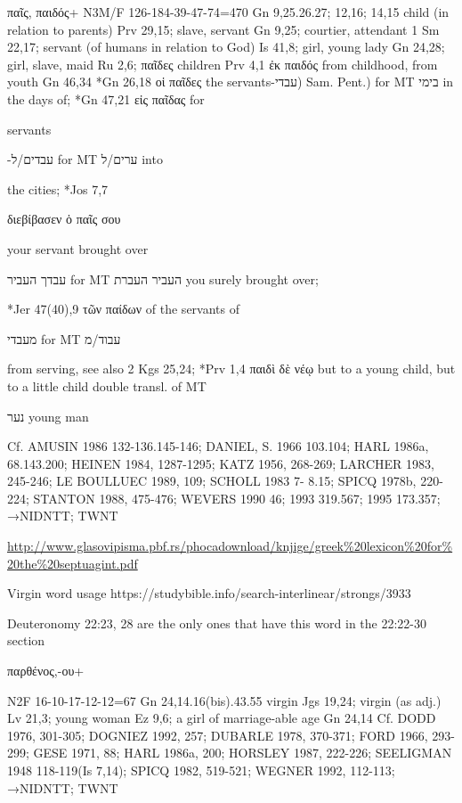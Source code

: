 \documentclass[11pt]{article}
\begin{document}
\begin{greek} παῖς, παιδός+ N3M/F 126-184-39-47-74=470
Gn 9,25.26.27; 12,16; 14,15
child (in relation to parents) Prv 29,15; slave, servant Gn 9,25; courtier, attendant 1 Sm 22,17; servant
(of humans in relation to God) Is 41,8; girl, young lady Gn 24,28; girl, slave, maid Ru 2,6; παῖδες
children Prv 4,1
ἐκ παιδός from childhood, from youth Gn 46,34
*Gn 26,18 οἱ παῖδες the servants-עבדי) Sam. Pent.) for MT בימי in the days of; *Gn 47,21 εἰς παῖδας for \end{greek}
servants\begin{hebrew} -עבדים/ל for MT ערים/ל into \end{hebrew} the cities; *Jos 7,7 \begin{greek} διεβίβασεν ὁ παῖς σου \end{greek} your servant brought over
\begin{hebrew}
 עבדך
העביר for MT העביר העברת you surely brought over; 
 \end{hebrew}
\begin{greek}  *Jer 47(40),9 τῶν παίδων of the servants of \end{greek}
\begin{hebrew}
  מעבדי
for MT עבוד/מ 
\end{hebrew}
\begin{greek}
from serving, see also 2 Kgs 25,24; *Prv 1,4 παιδὶ δὲ νέῳ but to a young child, but to
a little child double transl. of MT
\end{greek}
\begin{hebrew}
 נער young man
\end{hebrew}
Cf. AMUSIN 1986 132-136.145-146; DANIEL, S. 1966 103.104; HARL 1986a, 68.143.200; HEINEN 1984,
1287-1295; KATZ 1956, 268-269; LARCHER 1983, 245-246; LE BOULLUEC 1989, 109; SCHOLL 1983 7-
8.15; SPICQ 1978b, 220-224; STANTON 1988, 475-476; WEVERS 1990 46; 1993 319.567; 1995 173.357;
→NIDNTT; TWNT 

\url{http://www.glasovipisma.pbf.rs/phocadownload/knjige/greek%20lexicon%20for%20the%20septuagint.pdf}



Virgin word usage https://studybible.info/search-interlinear/strongs/3933

 Deuteronomy 22:23, 28 are the only ones that have this word in the 22:22-30 section

\begin{greek}
παρθένος,-ου+ \end{greek} N2F 16-10-17-12-12=67
Gn 24,14.16(bis).43.55
virgin Jgs 19,24; virgin (as adj.) Lv 21,3; young woman Ez 9,6; a girl of marriage-able age Gn 24,14
Cf. DODD 1976, 301-305; DOGNIEZ 1992, 257; DUBARLE 1978, 370-371; FORD 1966, 293-299; GESE
1971, 88; HARL 1986a, 200; HORSLEY 1987, 222-226; SEELIGMAN 1948 118-119(Is 7,14); SPICQ 1982,
519-521; WEGNER 1992, 112-113; →NIDNTT; TWNT
\end{document}
